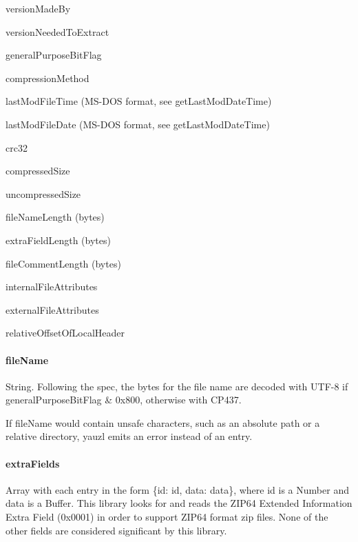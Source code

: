 \begin{DoxyItemize}
\item {\ttfamily version\+Made\+By}
\item {\ttfamily version\+Needed\+To\+Extract}
\item {\ttfamily general\+Purpose\+Bit\+Flag}
\item {\ttfamily compression\+Method}
\item {\ttfamily last\+Mod\+File\+Time} (M\+S-\/\+D\+OS format, see {\ttfamily get\+Last\+Mod\+Date\+Time})
\item {\ttfamily last\+Mod\+File\+Date} (M\+S-\/\+D\+OS format, see {\ttfamily get\+Last\+Mod\+Date\+Time})
\item {\ttfamily crc32}
\item {\ttfamily compressed\+Size}
\item {\ttfamily uncompressed\+Size}
\item {\ttfamily file\+Name\+Length} (bytes)
\item {\ttfamily extra\+Field\+Length} (bytes)
\item {\ttfamily file\+Comment\+Length} (bytes)
\item {\ttfamily internal\+File\+Attributes}
\item {\ttfamily external\+File\+Attributes}
\item {\ttfamily relative\+Offset\+Of\+Local\+Header}
\end{DoxyItemize}

\paragraph*{file\+Name}

{\ttfamily String}. Following the spec, the bytes for the file name are decoded with {\ttfamily U\+T\+F-\/8} if {\ttfamily general\+Purpose\+Bit\+Flag \& 0x800}, otherwise with {\ttfamily C\+P437}.

If {\ttfamily file\+Name} would contain unsafe characters, such as an absolute path or a relative directory, yauzl emits an error instead of an entry.

\paragraph*{extra\+Fields}

{\ttfamily Array} with each entry in the form {\ttfamily \{id\+: id, data\+: data\}}, where {\ttfamily id} is a {\ttfamily Number} and {\ttfamily data} is a {\ttfamily Buffer}. This library looks for and reads the Z\+I\+P64 Extended Information Extra Field (0x0001) in order to support Z\+I\+P64 format zip files. None of the other fields are considered significant by this library.

